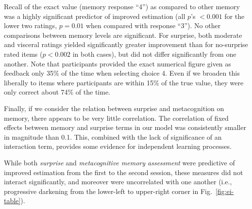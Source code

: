 Recall of the exact value (memory response ``4'') as compared to other memory was
a highly significant predictor of improved estimation (all $p$'s $< 0.001$ for the
lower two ratings, $p = 0.01$ when compared with response ``3''). No other
comparisons between memory levels are significant. For surprise, both moderate
and visceral ratings yielded significantly greater improvement than for
no-surprise rated items ($p < 0.002$ in both cases), but did not differ
significantly from one another. Note that participants provided the exact
numerical figure given as feedback only 35\% of the time when selecting choice
4. Even if we broaden this liberally to items where participants are within 15\%
of the true value, they were only correct about 74\% of the time.

Finally, if we consider the relation between surprise and metacognition on
memory, there
appears to be very little correlation. The correlation of fixed effects between
memory and surprise terms in our model was consistently smaller in magnitude
than 0.1. This, combined with the lack of significance of an interaction term,
provides some evidence for independent learning processes.

While both \emph{surprise} and \emph{metacognitive memory assessment} were
predictive of improved estimation from the first to the second session, these
measures did not interact significantly, and moreover were uncorrelated with one
another (i.e., progressive darkening from the lower-left to upper-right corner
in Fig.~\ref{fig:ei-table}). 






